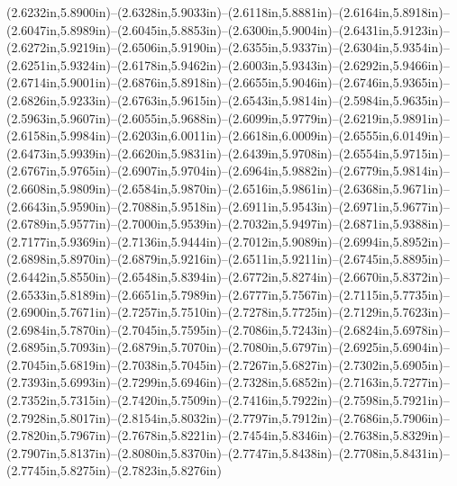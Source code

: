 (2.6232in,5.8900in)--(2.6328in,5.9033in)--(2.6118in,5.8881in)--(2.6164in,5.8918in)--(2.6047in,5.8989in)--(2.6045in,5.8853in)--(2.6300in,5.9004in)--(2.6431in,5.9123in)--(2.6272in,5.9219in)--(2.6506in,5.9190in)--(2.6355in,5.9337in)--(2.6304in,5.9354in)--(2.6251in,5.9324in)--(2.6178in,5.9462in)--(2.6003in,5.9343in)--(2.6292in,5.9466in)--(2.6714in,5.9001in)--(2.6876in,5.8918in)--(2.6655in,5.9046in)--(2.6746in,5.9365in)--(2.6826in,5.9233in)--(2.6763in,5.9615in)--(2.6543in,5.9814in)--(2.5984in,5.9635in)--(2.5963in,5.9607in)--(2.6055in,5.9688in)--(2.6099in,5.9779in)--(2.6219in,5.9891in)--(2.6158in,5.9984in)--(2.6203in,6.0011in)--(2.6618in,6.0009in)--(2.6555in,6.0149in)--(2.6473in,5.9939in)--(2.6620in,5.9831in)--(2.6439in,5.9708in)--(2.6554in,5.9715in)--(2.6767in,5.9765in)--(2.6907in,5.9704in)--(2.6964in,5.9882in)--(2.6779in,5.9814in)--(2.6608in,5.9809in)--(2.6584in,5.9870in)--(2.6516in,5.9861in)--(2.6368in,5.9671in)--(2.6643in,5.9590in)--(2.7088in,5.9518in)--(2.6911in,5.9543in)--(2.6971in,5.9677in)--(2.6789in,5.9577in)--(2.7000in,5.9539in)--(2.7032in,5.9497in)--(2.6871in,5.9388in)--(2.7177in,5.9369in)--(2.7136in,5.9444in)--(2.7012in,5.9089in)--(2.6994in,5.8952in)--(2.6898in,5.8970in)--(2.6879in,5.9216in)--(2.6511in,5.9211in)--(2.6745in,5.8895in)--(2.6442in,5.8550in)--(2.6548in,5.8394in)--(2.6772in,5.8274in)--(2.6670in,5.8372in)--(2.6533in,5.8189in)--(2.6651in,5.7989in)--(2.6777in,5.7567in)--(2.7115in,5.7735in)--(2.6900in,5.7671in)--(2.7257in,5.7510in)--(2.7278in,5.7725in)--(2.7129in,5.7623in)--(2.6984in,5.7870in)--(2.7045in,5.7595in)--(2.7086in,5.7243in)--(2.6824in,5.6978in)--(2.6895in,5.7093in)--(2.6879in,5.7070in)--(2.7080in,5.6797in)--(2.6925in,5.6904in)--(2.7045in,5.6819in)--(2.7038in,5.7045in)--(2.7267in,5.6827in)--(2.7302in,5.6905in)--(2.7393in,5.6993in)--(2.7299in,5.6946in)--(2.7328in,5.6852in)--(2.7163in,5.7277in)--(2.7352in,5.7315in)--(2.7420in,5.7509in)--(2.7416in,5.7922in)--(2.7598in,5.7921in)--(2.7928in,5.8017in)--(2.8154in,5.8032in)--(2.7797in,5.7912in)--(2.7686in,5.7906in)--(2.7820in,5.7967in)--(2.7678in,5.8221in)--(2.7454in,5.8346in)--(2.7638in,5.8329in)--(2.7907in,5.8137in)--(2.8080in,5.8370in)--(2.7747in,5.8438in)--(2.7708in,5.8431in)--(2.7745in,5.8275in)--(2.7823in,5.8276in)
